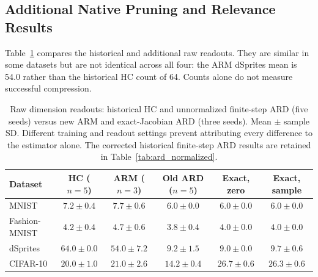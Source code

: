 \documentclass[make,article,submit,pdftex,moreauthors]{Definitions/mdpi}
\begin{document}
\subsection{Additional Native Pruning and Relevance Results}\label{sec:newpruning}
Table~\ref{tab:newcounts} compares the historical and additional raw
readouts. They are similar in some datasets but are not identical across
all four: the ARM dSprites mean is 54.0 rather than the historical HC
count of 64. Counts alone do not measure successful compression.
\begin{table}[H]
\caption{Raw dimension readouts: historical HC and unnormalized finite-step ARD (five seeds) versus new ARM and exact-Jacobian ARD (three seeds). Mean $\pm$ sample SD. Different training and readout settings prevent attributing every difference to the estimator alone. The corrected historical finite-step ARD results are retained in Table~\ref{tab:ard_normalized}.}\label{tab:newcounts}
\footnotesize
\setlength{\tabcolsep}{3pt}
\begin{tabular*}{\textwidth}{@{\extracolsep{\fill}}lccccc@{}}
\toprule
Dataset & HC ($n=5$) & ARM ($n=3$) & Old ARD ($n=5$) & Exact, zero & Exact, sample \\
\midrule
MNIST & $7.2 \pm 0.4$ & $7.7 \pm 0.6$ & $6.0 \pm 0.0$ & $6.0 \pm 0.0$ & $6.0 \pm 0.0$ \\
Fashion-MNIST & $4.2 \pm 0.4$ & $4.7 \pm 0.6$ & $3.8 \pm 0.4$ & $4.0 \pm 0.0$ & $4.0 \pm 0.0$ \\
dSprites & $64.0 \pm 0.0$ & $54.0 \pm 7.2$ & $9.2 \pm 1.5$ & $9.0 \pm 0.0$ & $9.7 \pm 0.6$ \\
CIFAR-10 & $20.0 \pm 1.0$ & $21.0 \pm 2.6$ & $14.2 \pm 0.4$ & $26.7 \pm 0.6$ & $26.3 \pm 0.6$ \\
\bottomrule\end{tabular*}
\end{table}
\end{document}
